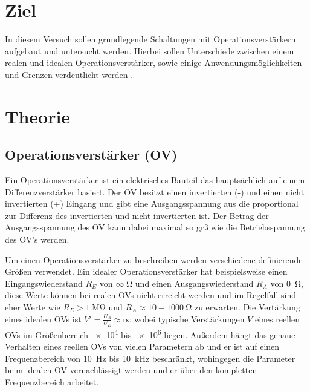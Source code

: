 \section*{Ziel}
    In diesem Versuch sollen grundlegende Schaltungen mit Operationsverstärkern aufgebaut und untersucht werden.
    Hierbei sollen Unterschiede zwischen einem realen und idealen Operationsverstärker, sowie einige Anwendungsmöglichkeiten und Grenzen verdeutlicht werden \cite{anleitung}.
\section{Theorie}
    \label{sec:theorie}
    \subsection{Operationsverstärker (OV)}
    Ein Operationsverstärker ist ein elektrisches Bauteil das hauptsächlich auf einem Differenzverstärker basiert.
    Der OV besitzt einen invertierten (-) und einen nicht invertierten (+) Eingang und gibt eine Ausgangsspannung aus die proportional zur Differenz des invertierten und nicht invertierten ist.
    Der Betrag der Ausgangsspannung des OV kann dabei maximal so grß wie die Betriebsspannung des OV's werden.

    Um einen Operationsverstärker zu beschreiben werden verschiedene definierende Größen verwendet.
    Ein idealer Operationsverstärker hat beispielsweise einen Eingangswiederstand $R_E$ von $\infty \; \si{\ohm}$ und einen Ausgangswiederstand $R_A$ von \SI{0}{\ohm}, diese Werte können bei realen OVs nicht erreicht werden und im Regelfall sind eher Werte wie $R_E > \SI{1}{\mega\ohm}$ und $R_A ≈ \num{10}-\SI{1000}{\ohm}$ zu erwarten.
    Die Vertärkung eines idealen OVs ist $V' = \frac{U_A}{U_E} ≈ \infty$ wobei typische Verstärkungen $V$ eines reellen OVs im Größenbereich \num{e4} bis \num{e6} liegen.
    Außerdem hängt das genaue Verhalten eines reellen OVs von vielen Parametern ab und er ist auf einen Frequenzbereich von \SI{10}{\hertz} bis \SI{10}{\kilo\hertz} beschränkt, wohingegen die Parameter beim idealen OV vernachlässigt werden und er über den kompletten Frequenzbereich arbeitet.
